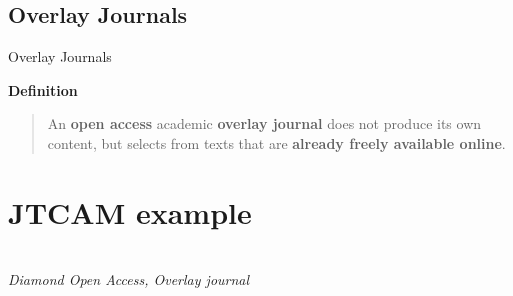 \documentclass[10pt,compress,serif,aspectratio=169]{beamer}
\newcommand{\fig}[2]{\centering{\texttt{[image: \#2]}}}
\begin{document}

\subsection{Overlay Journals}

\begin{frame}[t]{Overlay Journals}

 \textbf{Definition}\newline\newline
 \begin{quote}
   An \textbf{open access} academic \textbf{overlay journal} does not produce its own content, but selects from texts that are \textbf{already freely available online}.
 \end{quote}

 
\end{frame}
 
\section{JTCAM example}

\begin{frame}[t]
  \begin{center}
  \vspace{1cm}
  \fig{.8}{logo2023}\\
  \vspace{.2cm}
  \textit{Diamond Open Access, Overlay journal}\\
  \end{center}
  \fig{.6}{equipe2_}
  
\end{frame}

\end{document}
